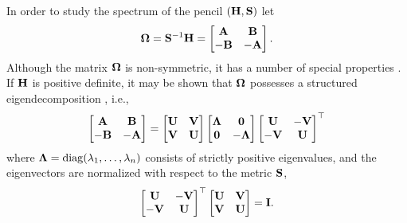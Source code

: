 In order to study the spectrum of the pencil $(\mathbf{H},\mathbf{S})$ let
\begin{equation}
  \bOmega = \bS\inv\bH = \begin{bmatrix*}
    \bA & \bB \\
    -\bB & -\bA
  \end{bmatrix*}.
  \label{eq:defOmega}
\end{equation}
Although the matrix $\mathbf{\Omega}$ is non-symmetric, it has a number of special properties \cite{olje1988,beme1998,bali2012}. 
If $\mathbf{H}$ is positive definite, it may be shown that $\mathbf{\Omega}$ possesses a structured eigendecomposition \cite{Jorgensen_book,SJYDL2016}, i.e.,
\begin{equation}
  \begin{bmatrix*} \bA & \bB \\ -\bB & -\bA \end{bmatrix*}
  = \begin{bmatrix*} \bU & \bV \\ \bV & \bU \end{bmatrix*}
    \begin{bmatrix*} \bLambda & \vc 0 \\ \vc 0 & -\bLambda \end{bmatrix*}
    \begin{bmatrix*} \bU & -\bV \\ -\bV & \bU \end{bmatrix*}\T
\end{equation}
where $\mathbf{\Lambda} = \operatorname{diag}(\lambda_1,\dotsc,\lambda_n)$ consists of strictly positive eigenvalues, 
and the eigenvectors are normalized with respect to the metric $\mathbf{S}$,
\begin{equation}
  \begin{bmatrix*} \bU & -\bV \\ -\bV & \bU \end{bmatrix*}\T
  \begin{bmatrix*} \bU &  \bV \\  \bV & \bU \end{bmatrix*} = \bI.
  \label{eq:eigvec-normalization}
\end{equation}

